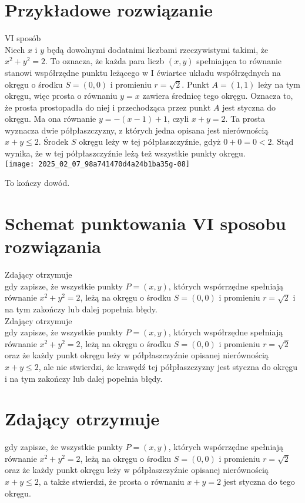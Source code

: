 \documentclass[10pt]{article}
\begin{document}
\section*{Przykładowe rozwiązanie}
VI sposób\\
Niech $x$ i $y$ będą dowolnymi dodatnimi liczbami rzeczywistymi takimi, że $x^{2}+y^{2}=2$. To oznacza, że każda para liczb $(x, y)$ spełniająca to równanie stanowi współrzędne punktu leżącego w I ćwiartce układu współrzędnych na okręgu o środku $S=(0,0)$ i promieniu $r=\sqrt{2}$. Punkt $A=(1,1)$ leży na tym okręgu, więc prosta o równaniu $y=x$ zawiera średnicę tego okręgu. Oznacza to, że prosta prostopadła do niej i przechodząca przez punkt $A$ jest styczna do okręgu. Ma ona równanie $y=-(x-1)+1$, czyli $x+y=2$. Ta prosta wyznacza dwie półpłaszczyzny, z których jedna opisana jest nierównością $x+y \leq 2$. Środek $S$ okręgu leży w tej półpłaszczyźnie, gdyż $0+0=0<2$. Stąd wynika, że w tej półpłaszczyźnie leżą też wszystkie punkty okręgu.\\
\texttt{[image: 2025\_02\_07\_98a741470d4a24b1ba35g-08]}

To kończy dowód.

\section*{Schemat punktowania VI sposobu rozwiązania}
Zdający otrzymuje\\
gdy zapisze, że wszystkie punkty $P=(x, y)$, których wspórrzędne spełniają równanie $x^{2}+y^{2}=2$, leżą na okręgu o środku $S=(0,0)$ i promieniu $r=\sqrt{2}$ i na tym zakończy lub dalej popełnia błędy.\\
Zdający otrzymuje\\
gdy zapisze, że wszystkie punkty $P=(x, y)$, których współrzędne spełniają równanie $x^{2}+y^{2}=2$, leżą na okręgu o środku $S=(0,0)$ i promieniu $r=\sqrt{2}$ oraz że każdy punkt okręgu leży w półpłaszczyźnie opisanej nierównością $x+y \leq 2$, ale nie stwierdzi, że krawędź tej półpłaszczyzny jest styczna do okręgu i na tym zakończy lub dalej popełnia błędy.

\section*{Zdający otrzymuje}
gdy zapisze, że wszystkie punkty $P=(x, y)$, których wspórrzędne spełniają równanie $x^{2}+y^{2}=2$, leżą na okręgu o środku $S=(0,0)$ i promieniu $r=\sqrt{2}$ oraz że każdy punkt okręgu leży w półpłaszczyźnie opisanej nierównością $x+y \leq 2$, a także stwierdzi, że prosta o równaniu $x+y=2$ jest styczna do tego okręgu.
\end{document}
